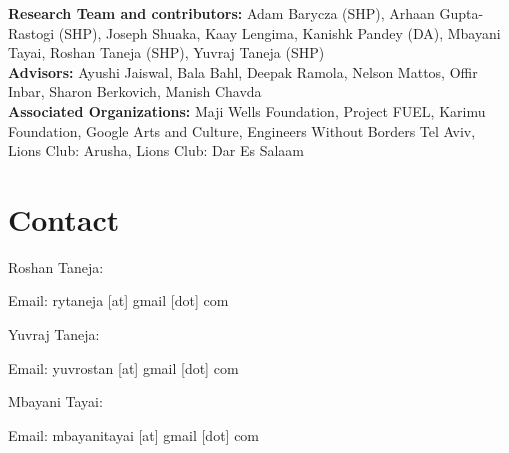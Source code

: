 \documentclass[10pt, twocolumn]{article}
\begin{document}
\textbf{Research Team and contributors:} Adam Barycza (SHP), Arhaan Gupta-Rastogi (SHP), Joseph Shuaka, Kaay Lengima, Kanishk Pandey (DA), Mbayani Tayai, Roshan Taneja (SHP), Yuvraj Taneja (SHP)
\\ \newline
\textbf{Advisors:} Ayushi Jaiswal, Bala Bahl, Deepak Ramola, Nelson Mattos, Offir Inbar, Sharon Berkovich, Manish Chavda
\\ \newline
\textbf{Associated Organizations:} Maji Wells Foundation, Project FUEL, Karimu Foundation, Google Arts and Culture, Engineers Without Borders Tel Aviv, Lions Club: Arusha, Lions Club: Dar Es Salaam

\nocite{*}
\printbibliography

\section*{Contact}

Roshan Taneja:

Email: rytaneja [at] gmail [dot] com
\newline

Yuvraj Taneja:

Email: yuvrostan [at] gmail [dot] com
\newline

Mbayani Tayai:

Email: mbayanitayai [at] gmail [dot] com
\end{document}
